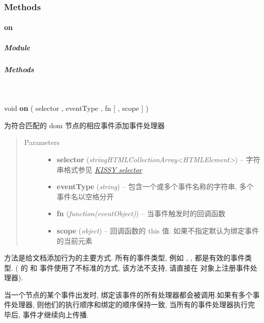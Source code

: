 \documentclass[letterpaper,10pt,english]{sphinxmanual}
\begin{document}
\subsubsection{Methods}
\label{api/core/event/index:methods}

\paragraph{on}
\label{api/core/event/on:on}\label{api/core/event/on::doc}

\subparagraph{Module}
\label{api/core/event/on:module}\begin{quote}

{\hyperref[api/core/event/index:module-Event]{}}
\end{quote}


\subparagraph{Methods}
\label{api/core/event/on:methods}

\begin{fulllineitems}
\label{api/core/event/on:Event.on}~
\begin{DUlineblock}{0em}
\item[] void \textbf{on} ( selector , eventType , fn {[} , scope {]} )
\item[] 为符合匹配的 dom 节点的相应事件添加事件处理器
\end{DUlineblock}
\begin{quote}\begin{description}
\item[{Parameters}] \leavevmode\begin{itemize}
\item {}
\textbf{selector} (\emph{string\textbar{}HTMLCollection\textbar{}Array\textless{}HTMLElement\textgreater{}}) -- 字符串格式参见 {\hyperref[api/core/dom/selector:dom-selector]{\emph{KISSY selector}}}

\item {}
\textbf{eventType} (\emph{string}) -- 包含一个或多个事件名称的字符串, 多个事件名以空格分开

\item {}
\textbf{fn} (\emph{function(eventObject)}) -- 当事件触发时的回调函数

\item {}
\textbf{scope} (\emph{object}) -- 回调函数的 this 值. 如果不指定默认为绑定事件的当前元素

\end{itemize}

\end{description}\end{quote}

 方法是给文档添加行为的主要方式. 所有的事件类型, 例如  ,  ,  都是有效的事件类型.
(  的  和  事件使用了不标准的方式, 该方法不支持, 请直接在  对象上注册事件处理器).

当一个节点的某个事件出发时, 绑定该事件的所有处理器都会被调用.如果有多个事件处理器, 则他们的执行顺序和绑定的顺序保持一致, 当所有的事件处理器执行完毕后,
事件才继续向上传播.

\end{fulllineitems}
\end{document}
